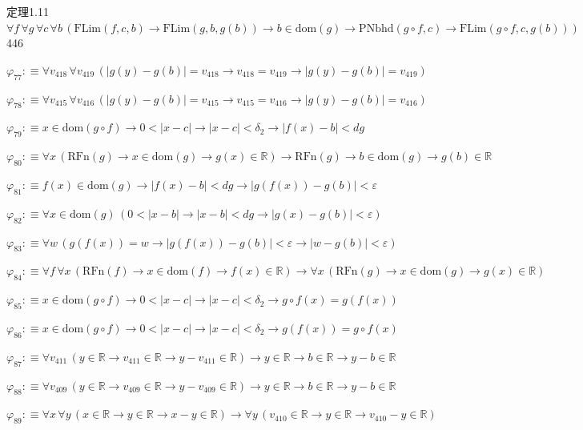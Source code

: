 \begin{fullproof}{定理1.11}{$\forall f\,\forall g\,\forall c\,\forall b\,(\mathrm{FLim}(f,c,b) \to \mathrm{FLim}(g,b,g(b)) \to b \in \mathrm{dom}(g) \to \mathrm{PNbhd}(g \circ f,c) \to \mathrm{FLim}(g \circ f,c,g(b)))$}{446}
\begin{abbrevlist}
\item $\varphi_{77} :\equiv \forall v_{418}\,\forall v_{419}\,(\lvert g(y) - g(b) \rvert = v_{418} \to v_{418} = v_{419} \to \lvert g(y) - g(b) \rvert = v_{419})$
\item $\varphi_{78} :\equiv \forall v_{415}\,\forall v_{416}\,(\lvert g(y) - g(b) \rvert = v_{415} \to v_{415} = v_{416} \to \lvert g(y) - g(b) \rvert = v_{416})$
\item $\varphi_{79} :\equiv x \in \mathrm{dom}(g \circ f) \to 0 < \lvert x - c \rvert \to \lvert x - c \rvert < \delta_{2} \to \lvert f(x) - b \rvert < \mathit{dg}$
\item $\varphi_{80} :\equiv \forall x\,(\mathrm{RFn}(g) \to x \in \mathrm{dom}(g) \to g(x) \in \mathbb{R}) \to \mathrm{RFn}(g) \to b \in \mathrm{dom}(g) \to g(b) \in \mathbb{R}$
\item $\varphi_{81} :\equiv f(x) \in \mathrm{dom}(g) \to \lvert f(x) - b \rvert < \mathit{dg} \to \lvert g(f(x)) - g(b) \rvert < \varepsilon$
\item $\varphi_{82} :\equiv \forall x \in \mathrm{dom}(g)\,(0 < \lvert x - b \rvert \to \lvert x - b \rvert < \mathit{dg} \to \lvert g(x) - g(b) \rvert < \varepsilon)$
\item $\varphi_{83} :\equiv \forall w\,(g(f(x)) = w \to \lvert g(f(x)) - g(b) \rvert < \varepsilon \to \lvert w - g(b) \rvert < \varepsilon)$
\item $\varphi_{84} :\equiv \forall f\,\forall x\,(\mathrm{RFn}(f) \to x \in \mathrm{dom}(f) \to f(x) \in \mathbb{R}) \to \forall x\,(\mathrm{RFn}(g) \to x \in \mathrm{dom}(g) \to g(x) \in \mathbb{R})$
\item $\varphi_{85} :\equiv x \in \mathrm{dom}(g \circ f) \to 0 < \lvert x - c \rvert \to \lvert x - c \rvert < \delta_{2} \to g \circ f(x) = g(f(x))$
\item $\varphi_{86} :\equiv x \in \mathrm{dom}(g \circ f) \to 0 < \lvert x - c \rvert \to \lvert x - c \rvert < \delta_{2} \to g(f(x)) = g \circ f(x)$
\item $\varphi_{87} :\equiv \forall v_{411}\,(y \in \mathbb{R} \to v_{411} \in \mathbb{R} \to y - v_{411} \in \mathbb{R}) \to y \in \mathbb{R} \to b \in \mathbb{R} \to y - b \in \mathbb{R}$
\item $\varphi_{88} :\equiv \forall v_{409}\,(y \in \mathbb{R} \to v_{409} \in \mathbb{R} \to y - v_{409} \in \mathbb{R}) \to y \in \mathbb{R} \to b \in \mathbb{R} \to y - b \in \mathbb{R}$
\item $\varphi_{89} :\equiv \forall x\,\forall y\,(x \in \mathbb{R} \to y \in \mathbb{R} \to x - y \in \mathbb{R}) \to \forall y\,(v_{410} \in \mathbb{R} \to y \in \mathbb{R} \to v_{410} - y \in \mathbb{R})$

\end{abbrevlist}
\end{fullproof}
